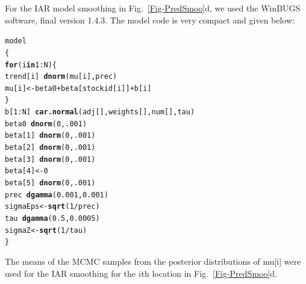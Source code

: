 \documentclass[11pt, titlepage]{article}\usepackage[]{graphicx}\usepackage[]{color}
\makeatletter
\newcommand{\hlnum}[1]{\textcolor[rgb]{0.686,0.059,0.569}{#1}}%
\newcommand{\hlopt}[1]{\textcolor[rgb]{0,0,0}{#1}}%
\newcommand{\hlstd}[1]{\textcolor[rgb]{0.345,0.345,0.345}{#1}}%
\newcommand{\hlkwa}[1]{\textcolor[rgb]{0.161,0.373,0.58}{\textbf{#1}}}%
\newcommand{\hlkwb}[1]{\textcolor[rgb]{0.69,0.353,0.396}{#1}}%
\newcommand{\hlkwd}[1]{\textcolor[rgb]{0.737,0.353,0.396}{\textbf{#1}}}%
\newenvironment{kframe}{%
 \def\at@end@of@kframe{}%
 \ifinner\ifhmode%
  \def\at@end@of@kframe{\end{minipage}}%
  \begin{minipage}{\columnwidth}%
 \fi\fi%
 \def\FrameCommand##1{\hskip\@totalleftmargin \hskip-\fboxsep
 \colorbox{shadecolor}{##1}\hskip-\fboxsep
     \hskip-\linewidth \hskip-\@totalleftmargin \hskip\columnwidth}%
 \MakeFramed {\advance\hsize-\width
   \@totalleftmargin\z@ \linewidth\hsize
   \@setminipage}}%
 {\par\unskip\endMakeFramed%
 \at@end@of@kframe}
\newenvironment{knitrout}{}{} %
\makeatother
\begin{document}
For the IAR model smoothing in Fig.~\ref{Fig-PredSmoo}d, we used the WinBUGS \citep{Lunn:Thom:Best:Spie:winb:2000} software, final version 1.4.3.  The model code is very compact and given below:
\newpage
\begin{knitrout}\tiny
{}\color{fgcolor}\begin{kframe}
\begin{alltt}
\hlstd{model}
  \hlstd{\{}
    \hlkwa{for}\hlstd{(i} \hlkwa{in} \hlnum{1}\hlopt{:}\hlstd{N) \{}
      \hlstd{trend[i]} \hlopt{~} \hlkwd{dnorm}\hlstd{(mu[i],prec)}
      \hlstd{mu[i]} \hlkwb{<-} \hlstd{beta0} \hlopt{+} \hlstd{beta[stockid[i]]} \hlopt{+} \hlstd{b[i]}
          \hlstd{\}}
    \hlstd{b[}\hlnum{1}\hlopt{:}\hlstd{N]} \hlopt{~} \hlkwd{car.normal}\hlstd{(adj[], weights[], num[], tau)}
    \hlstd{beta0} \hlopt{~} \hlkwd{dnorm}\hlstd{(}\hlnum{0}\hlstd{,}\hlnum{.001}\hlstd{)}
    \hlstd{beta[}\hlnum{1}\hlstd{]} \hlopt{~} \hlkwd{dnorm}\hlstd{(}\hlnum{0}\hlstd{,}\hlnum{.001}\hlstd{)}
    \hlstd{beta[}\hlnum{2}\hlstd{]} \hlopt{~} \hlkwd{dnorm}\hlstd{(}\hlnum{0}\hlstd{,}\hlnum{.001}\hlstd{)}
    \hlstd{beta[}\hlnum{3}\hlstd{]} \hlopt{~} \hlkwd{dnorm}\hlstd{(}\hlnum{0}\hlstd{,}\hlnum{.001}\hlstd{)}
    \hlstd{beta[}\hlnum{4}\hlstd{]} \hlkwb{<-} \hlnum{0}
    \hlstd{beta[}\hlnum{5}\hlstd{]} \hlopt{~} \hlkwd{dnorm}\hlstd{(}\hlnum{0}\hlstd{,}\hlnum{.001}\hlstd{)}
    \hlstd{prec} \hlopt{~} \hlkwd{dgamma}\hlstd{(}\hlnum{0.001}\hlstd{,}\hlnum{0.001}\hlstd{)}
    \hlstd{sigmaEps} \hlkwb{<-} \hlkwd{sqrt}\hlstd{(}\hlnum{1}\hlopt{/}\hlstd{prec)}
    \hlstd{tau}  \hlopt{~} \hlkwd{dgamma}\hlstd{(}\hlnum{0.5}\hlstd{,} \hlnum{0.0005}\hlstd{)}
    \hlstd{sigmaZ} \hlkwb{<-} \hlkwd{sqrt}\hlstd{(}\hlnum{1} \hlopt{/} \hlstd{tau)}
  \hlstd{\}}
\end{alltt}
\end{kframe}
\end{knitrout}
The means of the MCMC samples from the posterior distributions of mu[i] were used for the IAR smoothing for the $i$th location in Fig.~\ref{Fig-PredSmoo}d.

\end{document}
